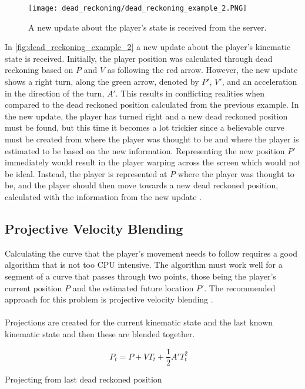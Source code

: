 \begin{figure}[H]
    \centering
    \texttt{[image: dead\_reckoning/dead\_reckoning\_example\_2.PNG]}
    \caption{A new update about the player's state is received from the server.}
    \label{fig:dead_reckoning_example_2}
\end{figure}
\noindent
In \autoref{fig:dead_reckoning_example_2} a new update about the player's kinematic state is received.
Initially, the player position was calculated through dead reckoning based on $P$ and $V$ as following the red arrow.
However, the new update shows a right turn, along the green arrow, denoted by $P'$, $V'$, and an acceleration in the direction of the turn, $A'$.
This results in conflicting realities when compared to the dead reckoned position calculated from the previous example.
In the new update, the player has turned right and a new dead reckoned position must be found, but this time it becomes a lot trickier since a believable curve must be created from where the player was thought to be and where the player is estimated to be based on the new information.
Representing the new position $P'$ immediately would result in the player warping across the screen which would not be ideal.
Instead, the player is represented at $ P $ where the player was thought to be, and the player should then move towards a new dead reckoned position, calculated with the information from the new update \cite{deadreckoning}.


\subsection{Projective Velocity Blending}
Calculating the curve that the player's movement needs to follow requires a good algorithm that is not too CPU intensive.
The algorithm must work well for a segment of a curve that passes through two points, those being the player's current position $P$ and the estimated future location $P'$.
The recommended approach for this problem is projective velocity blending \cite{deadreckoning}.
\\\\
Projections are created for the current kinematic state and the last known kinematic state and then these are blended together.

\begin{displaymath}
    P_t = P + VT_t + \frac{1}{2}A'T_t^2 \quad
\end{displaymath}
\begin{center}
    Projecting from last dead reckoned position
\end{center}

